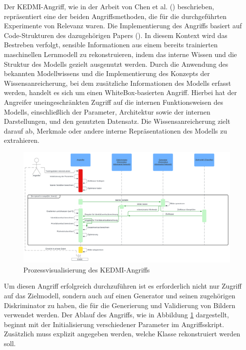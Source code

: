 Der \glqq KEDMI\grqq-Angriff, wie in der Arbeit von Chen et al. (\cite{chen_knowledge-enriched_2021}) beschrieben, repräsentiert eine der beiden Angriffsmethoden, die für die durchgeführten Experimente von Relevanz waren. Die Implementierung des Angriffs basiert auf Code-Strukturen des dazugehörigen Papers (\cite{chen_knowledge-enriched_2021}). In diesem Kontext wird das Bestreben verfolgt, sensible Informationen aus einem bereits trainierten maschinellen Lernmodell zu rekonstruieren, indem das interne Wissen und die Struktur des Modells gezielt ausgenutzt werden. Durch die Anwendung des bekannten Modellwissens und die Implementierung des Konzepts der \glqq Wissensanreicherung\grqq, bei dem zusätzliche Informationen des Modells erfasst werden, handelt es sich um einen \glqq WhiteBox-basierten\grqq{} Angriff. Hierbei hat der Angreifer uneingeschränkten Zugriff auf die internen Funktionsweisen des Modells, einschließlich der Parameter, Architektur sowie der internen Darstellungen, und den genutzten Datensatz. Die Wissensanreicherung zielt darauf ab, Merkmale oder andere interne Repräsentationen des Modells zu extrahieren.

\begin{figure}
	\centering
	\includegraphics[width=1\linewidth]{Bilder/KEDMI_PROCESS.png}
	\caption{Prozessvisualisierung des KEDMI-Angriffs}
	\label{img:kedmi_process}
\end{figure}

Um diesen Angriff erfolgreich durchzuführen ist es erforderlich nicht nur Zugriff auf das Zielmodell, sondern auch auf einen Generator und seinen zugehörigen Diskriminator zu haben, die für die Generierung und Validierung von Bildern verwendet werden. Der Ablauf des Angriffs, wie in Abbildung \ref{img:kedmi_process} dargestellt, beginnt mit der Initialisierung verschiedener Parameter im Angriffsskript. Zusätzlich muss explizit angegeben werden, welche Klasse rekonstruiert werden soll.

